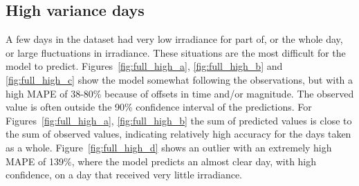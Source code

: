 \subsection{High variance days}
A few days in the dataset had very low irradiance for part of, or the whole day, or large fluctuations in irradiance. These situations are the most difficult for the model to predict. Figures~\ref{fig:full_high_a}, \ref{fig:full_high_b} and \ref{fig:full_high_c} show the model somewhat following the observations, but with a high MAPE of 38-80\% because of offsets in time and/or magnitude. The observed value is often outside the 90\% confidence interval of the predictions. For Figures~\ref{fig:full_high_a}, \ref{fig:full_high_b} the sum of predicted values is close to the sum of observed values, indicating relatively high accuracy for the days taken as a whole. Figure~\ref{fig:full_high_d} shows an outlier with an extremely high MAPE of 139\%, where the model predicts an almost clear day, with high confidence, on a day that received very little irradiance.
